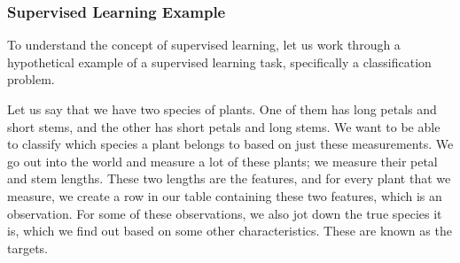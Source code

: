 %
%
%
%

\subsubsection{Supervised Learning Example}

To understand the concept of supervised learning, let us work through a
hypothetical example of a supervised learning task, specifically a
classification problem.

Let us say that we have two species of plants. One of them has long petals and
short stems, and the other has short petals and long stems. We want to be able
to classify which species a plant belongs to based on just these measurements.
We go out into the world and measure a lot of these plants; we measure their
petal and stem lengths. These two lengths are the features, and for every plant
that we measure, we create a row in our table containing these two features,
which is an observation. For some of these observations, we also jot down the
true species it is, which we find out based on some other characteristics.
These are known as the targets.


